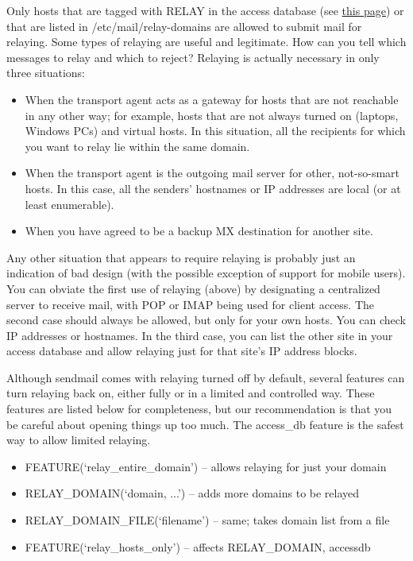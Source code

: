 Only hosts that are tagged with {RELAY} in the access database (see
\protect\hyperlink{part0026_split_034.htmlux5cux23_idTextAnchor1078}{this
page}) or that are listed in
\protect\hypertarget{part0026_split_037.htmlux5cux23_idIndexMarker2564}{}{}{/etc/mail/relay-domains}
are allowed to submit mail for relaying. Some types of relaying are
useful and legitimate. How can you tell which messages to relay and
which to reject? Relaying is actually necessary in only three
situations:

\begin{itemize}
\tightlist
\item
  When the transport agent acts as a gateway for hosts that are not
  reachable in any other way; for example, hosts that are not always
  turned on (laptops, Windows PCs) and virtual hosts. In this situation,
  all the recipients for which you want to relay lie within the same
  domain.
\item
  When the transport agent is the outgoing mail server for other,
  not-so-smart hosts. In this case, all the senders' hostnames or IP
  addresses are local (or at least enumerable).
\item
  When you have agreed to be a backup MX destination for another site.
\end{itemize}

Any other situation that appears to require relaying is probably just an
indication of bad design (with the possible exception of support for
mobile users). You can obviate the first use of relaying (above) by
designating a centralized server to receive mail, with POP or IMAP being
used for client access. The second case should always be allowed, but
only for your own hosts. You can check IP addresses or hostnames. In the
third case, you can list the other site in your access database and
allow relaying just for that site's IP address blocks.

Although {sendmail} comes with relaying turned off by default, several
features can turn relaying back on, either fully or in a limited and
controlled way. These features are listed below for completeness, but
our recommendation is that you be careful about opening things up too
much. The {access\_db} feature is the safest way to allow limited
relaying.

\begin{itemize}
\tightlist
\item
  {FEATURE(`}{\protect\hypertarget{part0026_split_037.htmlux5cux23_idIndexMarker2565}{}{}}{relay\_entire\_domain')}
  -- allows relaying for just your domain
\item
  \protect\hypertarget{part0026_split_037.htmlux5cux23_idIndexMarker2566}{}{}{RELAY\_DOMAIN(`}{domain}{,
  ...')} -- adds more domains to be relayed
\item
  {RELAY\_DOMAIN\_FILE(`}{filename}{')} -- same; takes domain list from
  a file
\item
  {FEATURE(`}{\protect\hypertarget{part0026_split_037.htmlux5cux23_idIndexMarker2567}{}{}}{relay\_hosts\_only')}
  -- affects {RELAY\_DOMAIN}, {accessdb}
\end{itemize}


